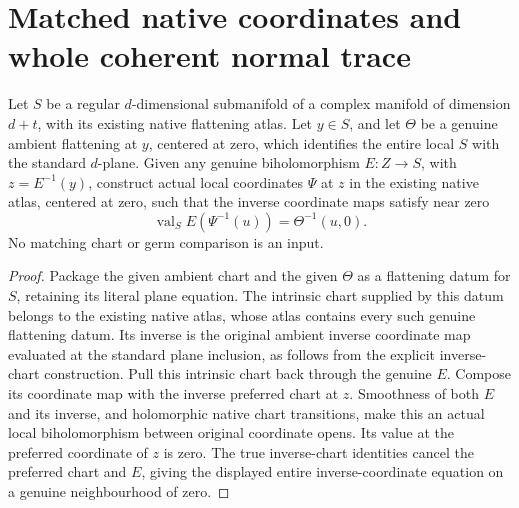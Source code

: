 \section{Matched native coordinates and whole coherent normal trace}

\begin{lemma}
\label{hir:disjoint-matched-intrinsic-chart}
\leanok
Let $S$ be a regular $d$-dimensional submanifold of a complex manifold
of dimension $d+t$, with its existing native flattening atlas. Let $y\in S$,
and let $\Theta$ be a genuine ambient flattening at $y$, centered at zero,
which identifies the entire local $S$ with the standard $d$-plane. Given any
genuine biholomorphism $E:Z\to S$, with $z=E^{-1}(y)$, construct actual local
coordinates $\Psi$ at $z$ in the existing native atlas, centered at zero, such
that the inverse coordinate maps satisfy near zero
\[
 \operatorname{val}_S E(\Psi^{-1}(u))
   =\Theta^{-1}(u,0).
\]
No matching chart or germ comparison is an input.
\end{lemma}
\begin{proof}
Package the given ambient chart and the given $\Theta$ as a flattening datum
for $S$, retaining its literal plane equation. The intrinsic chart supplied
by this datum belongs to the existing native atlas, whose atlas contains
every such genuine flattening datum. Its inverse is the original ambient
inverse coordinate map evaluated at the standard plane inclusion, as follows
from the explicit inverse-chart construction. Pull this intrinsic chart back
through the genuine $E$. Compose its coordinate map with the inverse preferred
chart at $z$. Smoothness of both $E$ and its inverse, and holomorphic native
chart transitions, make this an actual local biholomorphism between original
coordinate opens. Its value at the preferred coordinate of $z$ is zero.
The true inverse-chart identities cancel the preferred chart and $E$, giving
the displayed entire inverse-coordinate equation on a genuine neighbourhood
of zero.
\end{proof}

